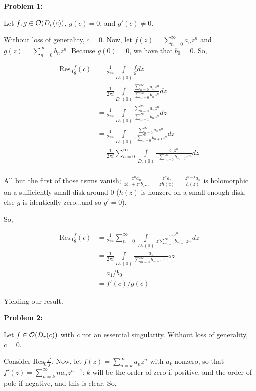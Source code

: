 \documentclass[a4paper,12pt]{article}
\begin{document}
{\bf Problem 1:}

Let $f, g \in \mathcal{O}(D_r(c))$, $g(c) = 0$, and $g'(c) \neq 0$. 

Without loss of generality, $c = 0$. Now, let $f(z) = \sum\limits_{n=0}^\infty a_nz^n$ and $g(z) = \sum\limits_{n=0}^\infty b_nz^n$. Because $g(0) = 0$, we have that $b_0 = 0$. So,

\begin{align*}
\text{Res}_0 \frac{f}{g} (c) &= \frac{1}{2\pi i} \int\limits_{D_r(0)} \frac{f}{g} dz\\
&= \frac{1}{2\pi i} \int\limits_{D_r(0)} \frac{\sum\limits_{n=0}^\infty a_nz^n}{\sum\limits_{n=0}^\infty b_nz^n} dz\\
&= \frac{1}{2\pi i} \int\limits_{D_r(0)} \frac{\sum\limits_{n=0}^\infty a_nz^n}{\sum\limits_{n=1}^\infty b_nz^n} dz\\
&= \frac{1}{2\pi i} \int\limits_{D_r(0)} \frac{\sum\limits_{n=0}^\infty a_nz^n}{z\sum\limits_{n=0}^\infty b_{n+1}z^n} dz\\
&= \frac{1}{2\pi i} \sum\limits_{n=0}^\infty \int\limits_{D_r(0)} \frac{a_nz^n}{z\sum\limits_{m=0}^\infty b_{m+1}z^m} dz\\
\end{align*} 

All but the first of those terms vanish; $\frac{z^na_n}{zb_1 + z^2b_2 \ldots } = \frac{z^na_n}{zh(z)} = \frac{z^{n-1}a_n}{h(z)}$ is holomorphic on a sufficiently small disk around $0$ ($h(z)$ is nonzero on a small enough disk, else $g$ is identically zero...and so $g' = 0$).

So, 

\begin{align*}
\text{Res}_0 \frac{f}{g} (c) &= \frac{1}{2\pi i} \sum\limits_{n=0}^\infty \int\limits_{D_r(0)} \frac{a_nz^n}{z\sum\limits_{m=0}^\infty b_{m+1}z^m} dz\\
&= \frac{1}{2\pi i}  \int\limits_{D_r(0)} \frac{a_1}{\sum\limits_{m=0}^\infty b_{m+1}z^m} dz\\
&= a_1/b_0\\
&= f'(c)/g(c)
\end{align*}  %

Yielding our result. 

\shunt

{\bf Problem 2:}

Let $f \in \mathcal{O}(\dot{D}_r(c))$ with $c$ not an essential singularity. Without loss of generality, $c=0$.

Consider $\text{Res}_0 \frac{f'}{f}$.  Now, let $f(z) = \sum\limits_{n=k}^\infty a_nz^n$ with $a_k$ nonzero, so that $f'(z) = \sum\limits_{n=k}^\infty na_nz^{n-1}$; $k$ will be the order of zero if positive, and the order of pole if negative, and this is clear. So, %
\end{document}
